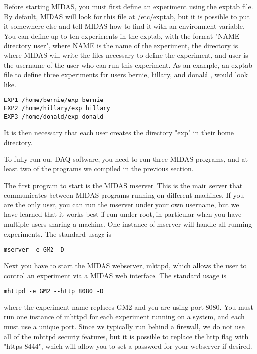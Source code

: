 Before starting MIDAS, you must first define an experiment using the exptab file. By default, MIDAS will look for this file at /etc/exptab, but it is possible to put it somewhere else and tell MIDAS how to find it with an environment variable. You can define up to ten experiments in the exptab, with the format "NAME directory user", where NAME is the name of the experiment, the directory is where MIDAS will write the files necessary to define the experiment, and user is the username of the user who can run this experiment. As an example, an exptab file to define three experiments for users bernie, hillary, and donald , would look like.

\begin{verbatim}
EXP1 /home/bernie/exp bernie
EXP2 /home/hillary/exp hillary
EXP3 /home/donald/exp donald
\end{verbatim}

It is then necessary that each user creates the directory "exp" in their home directory.

To fully run our DAQ software, you need to run three MIDAS programs, and at least two of the programs we compiled in the previous section.

The first program to start is the MIDAS mserver. This is the main server that communicates between MIDAS programs running on different machines. If you are the only user, you can run the mserver under your own username, but we have learned that it works best if run under root, in particular when you have multiple users sharing a machine. One instance of mserver will handle all running experiments. The standard usage is

\begin{verbatim}
mserver -e GM2 -D
\end{verbatim}

Next you have to start the MIDAS webserver, mhttpd, which allows the user to control an experiment via a MIDAS web interface. The standard usage is

\begin{verbatim}
mhttpd -e GM2 --http 8080 -D
\end{verbatim}

where the experiment name replaces GM2 and you are using port 8080. You must run one instance of mhttpd for each experiment running on a system, and each must use a unique port. Since we typically run behind a firewall, we do not use all of the mhttpd securiy features, but it is possible to replace the \-\-http flag with "\-\-https 8444", which will allow you to set a password for your webserver if desired.


